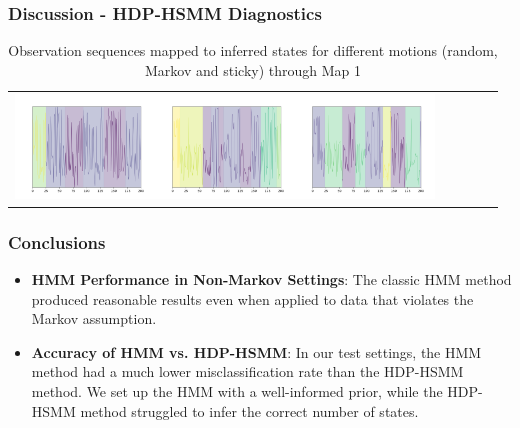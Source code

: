 \documentclass{beamer}
\begin{document}
\begin{frame}
    \frametitle{Discussion - HDP-HSMM Diagnostics}
    \newcommand{\addrandomseqa}{\includegraphics[width=10em]{images/hdphsmm/random-m1-seq.png}}
    \newcommand{\addmarkovseqa}{\includegraphics[width=10em]{images/hdphsmm/markov-m1-seq.png}}
    \newcommand{\addcorrseqa}{\includegraphics[width=10em]{images/hdphsmm/corr-m1-seq.png}}
    \begin{table}[H]
    \sffamily
    \centering
    \begin{tabular}{l*4{c}@{}}
    \addrandomseqa \addmarkovseqa \addcorrseqa \\
    \end{tabular}
    \caption{Observation sequences mapped to inferred states for different motions (random, Markov and sticky) through Map 1}
    \label{table:stateinfer}
    \end{table}
\end{frame}



\begin{frame}
	\frametitle{Conclusions}
	\begin{itemize}
		\item \textbf{HMM Performance in Non-Markov Settings}: The classic HMM method produced reasonable results even when applied to data that violates the Markov assumption.
		\item \textbf{Accuracy of HMM vs. HDP-HSMM}: In our test settings, the HMM method had a much lower misclassification rate than the HDP-HSMM method. We set up the HMM with a well-informed prior, while the HDP-HSMM method struggled to infer the correct number of states.
	\end{itemize}
\end{frame}
\end{document}
